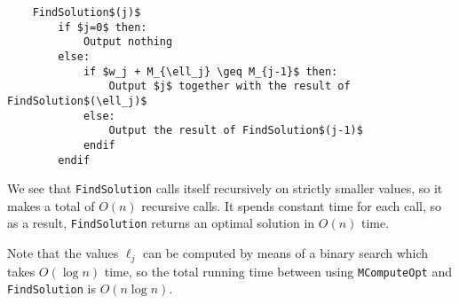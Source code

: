 \begin{lstlisting}
    FindSolution$(j)$
        if $j=0$ then:
            Output nothing
        else: 
            if $w_j + M_{\ell_j} \geq M_{j-1}$ then: 
                Output $j$ together with the result of FindSolution$(\ell_j)$
            else: 
                Output the result of FindSolution$(j-1)$
            endif 
        endif
\end{lstlisting}

We see that \texttt{FindSolution} calls itself recursively on strictly 
smaller values, so it makes a total of $O(n)$ recursive calls. It spends 
constant time for each call, so as a result, \texttt{FindSolution} returns 
an optimal solution in $O(n)$ time. 

Note that the values $\ell_j$ can be computed by means of a binary search 
which takes $O(\log n)$ time, so the total running time between 
using \texttt{MComputeOpt} and \texttt{FindSolution} is $O(n\log n)$. 
